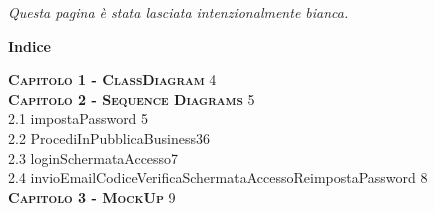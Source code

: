 \documentclass[a4paper,12pt]{article}
\begin{document}
\newpage\null\thispagestyle{empty}
\begin{center}
\vfil
\vfil
\textit{Questa pagina è stata lasciata intenzionalmente bianca. } 
\vfil
\vfil 
\end{center}
\newpage

\newpage\null{}\setcounter{page}{3}
\begin{flushleft}
\vspace*{+1cm}
\begingroup
\fontsize{35pt}{12pt}\selectfont\bf{Indice}
\endgroup
\vspace*{+1cm}

\Large\textsc{\bf Capitolo 1 - ClassDiagram} \hfill 4\\

\Large\textsc{\bf Capitolo 2 - Sequence Diagrams} \hfill 5\\
\hspace{+1cm}\large 2.1 impostaPassword \hfill 5\\
\hspace{+1cm}\large 2.2 ProcediInPubblicaBusiness3\hfill 6\\
\hspace{+1cm}\large 2.3 loginSchermataAccesso\hfill 7\\
\hspace{+1cm}\large 2.4 invioEmailCodiceVerificaSchermataAccessoReimpostaPassword \hfill 8\\

\Large\textsc{\bf Capitolo 3 - MockUp }\hfill 9\\

\end{flushleft}
\newpage

\newpage\null{}\setcounter{page}{4}
\end{document}
